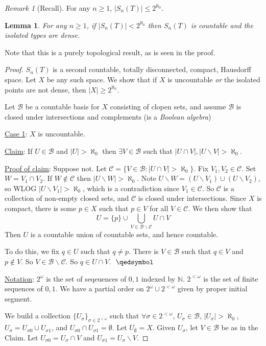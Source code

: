 \documentclass[]{article}
\theoremstyle{custhm}
\theoremstyle{cusdef}
\theoremstyle{custhm}
\newtheorem{lemma}[theorem]{Lemma}
\theoremstyle{custhm}
\theoremstyle{custhm}
\theoremstyle{ex}
\theoremstyle{custhm}
\theoremstyle{cusdef}
\theoremstyle{remark}
\newtheorem*{remark*}{Remark}
\theoremstyle{remark}
\renewcommand{\it}[1]{\textit{#1}}
\begin{document}
\begin{remark*}[Recall]
For any $n\ge1$, $|S_n(T)|\le 2^{\aleph_0}$.
\end{remark*}
\begin{lemma}
	For any $n\ge 1$, if $|S_n(T)| < 2^{\aleph_0}$ then $S_n(T)$ is countable and the isolated types are dense.
\end{lemma}
Note that this is a purely topological result, as is seen in the proof.
\begin{proof}
	$S_n(T)$ is a second countable, totally disconnected, compact, Hausdorff space. Let $X$ be any such space. We show that if $X$ is uncountable \it{or} the isolated points are not dense, then $|X| \ge 2^{\aleph_0}$.

	Let $\mathcal{B}$ be a countable basis for $X$ consisting of clopen sets, and assume $\mathcal{B}$ is closed under intersections and complements (is a \it{Boolean algebra})

	\underline{Case 1}: $X$ is uncountable.

	\underline{Claim}: If $U\in \mathcal{B}$ and $|U| > \aleph_0$ then $\exists V\in \mathcal{B}$ such that $|U\cap V|,|U\backslash V| > \aleph_0$.
	
	\underline{Proof of claim}: Suppose not. Let $\mathcal{C} = \{V\in \mathcal{B}:|U\cap V| > \aleph_0\}$. Fix $V_1,V_2\in \mathcal{C}$. Set $W = V_1\cap V_2$. If $W\not\in \mathcal{C}$ then $|U\backslash W| > \aleph_0$. Note $U\backslash W = (U\backslash V_1)\cup(U\backslash V_2)$, so WLOG $|U\backslash V_1| > \aleph_0$, which is a contradiction since $V_1\in \mathcal{C}$. So $\mathcal{C}$ is a collection of non-empty closed sets, and $\mathcal{C}$ is closed under intersections. Since $X$ is compact, there is some $p \in X$ such that $p \in V$ for all $V \in \mathcal{C}$. We then show that $$U = \{p\}\cup\bigcup_{V\in \mathcal{B}\backslash\mathcal{C}}U\cap V$$
	Then $U$ is a countable union of countable sets, and hence countable.

	To do this, we fix $q \in U$ such that $q \ne p$. There is $V\in \mathcal{B}$ such that $q \in V$ and $p \not \in V$. So $V \in \mathcal{B}\backslash \mathcal{C}$. So $q \in U\cap V$.$\ \  \qedsymbol$

	\underline{Notation}: $2^\omega$ is the set of seqeuences of $0,1$ indexed by $\mathbb{N}$. $2^{<\omega}$ is the set of finite sequences of $0,1$. We have a partial order on $2^\omega \cup 2^{<\omega}$ given by proper initial segment.

	We build a collection $\{U_\sigma\}_{\sigma\in 2^{<\omega}}$ such that $\forall \sigma \in 2^{<\omega}$, $U_\sigma \in \mathcal{B}$, $|U_{\sigma}| > \aleph_0$, $U_{\sigma} = U_{\sigma 0}\cup U_{\sigma 1}$, and $U_{\sigma0}\cap U_{\sigma1} = \emptyset$. Let $U_{\emptyset} = X$. Given $U_\sigma$, let $V \in \mathcal{B}$ be as in the Claim. Let $U_{\sigma 0} =  U_\sigma \cap V$ and $U_{\sigma 1} = U_\sigma\backslash V$.


\end{proof}
\end{document}
